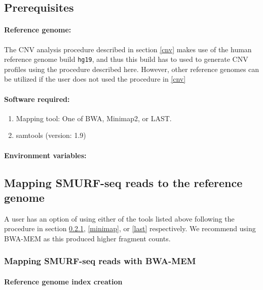 \documentclass[11pt]{article}
\begin{document}
\subsection{Prerequisites}
\paragraph{Reference genome:} The CNV analysis procedure described in 
section \ref{cnv} makes use of the human reference genome build 
\texttt{hg19}, and thus this build has to used to generate CNV profiles 
using the procedure described here. However, other reference genomes 
can be utilized if the user does not used the procedure in \ref{cnv}

\paragraph{Software required:}
\begin{enumerate}
  \item Mapping tool: One of BWA, Minimap2, or LAST.
  \item samtools \cite{li2009sequence} (version: 1.9)
\end{enumerate}

\paragraph{Environment variables:}
    

\subsection{Mapping SMURF-seq reads to the reference genome}

A user has an option of using either of the tools listed above following
the procedure in section \ref{bwa}, \ref{minimap}, or \ref{last} 
respectively. We recommend using BWA-MEM as this produced higher 
fragment counts.

\subsubsection{Mapping SMURF-seq reads with BWA-MEM}
\label{bwa}
\paragraph{Reference genome index creation}
\end{document}
